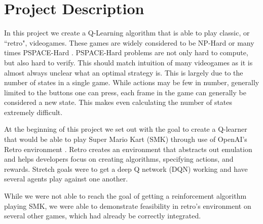 \section{Project Description}
In this project we create a Q-Learning algorithm that is able to play classic,
or ``retro", videogames. These games are widely considered to be NP-Hard or
many times PSPACE-Hard \cite{DBLP}. PSPACE-Hard problems are not only hard to
compute, but also hard to verify. This should match intuition of many videogames
as it is almost always unclear what an optimal strategy is. This is largely due
to the number of states in a single game. While actions may be few in number,
generally limited to the buttons one can press, each frame in the game can 
generally be considered a new state. This makes even calculating the number
of states extremely difficult. 

At the beginning of this project we set out with the goal to create a Q-learner
that would be able to play Super Mario Kart (SMK) \cite{SMK} through use of 
OpenAI's Retro environment \cite{retro}. Retro creates an environment that 
abstracts out emulation and helps developers focus on creating algorithms,
specifying actions, and rewards. Stretch goals were to get a deep Q network 
(DQN) working and have several agents play against one another.

While we were not able to reach the goal of getting a reinforcement algorithm
playing SMK, we were able to demonstrate feasibility in retro's environment on
several other games, which had already be correctly integrated.

%
